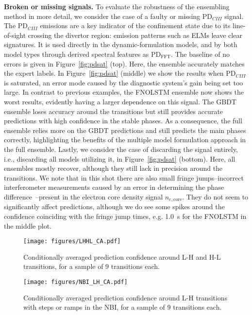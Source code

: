 \textbf{Broken or missing signals.} To evaluate the robustness of the ensembling method in more detail, we consider the case of a faulty or missing $\text{PD}_{\textit{CIII}}^{}$ signal. The $\text{PD}_{\textit{CIII}}^{}$ emissions are a key indicator of the confinement state due to its line-of-sight crossing the divertor region: emission patterns such as ELMs leave clear signatures. It is used directly in the dynamic-formulation models, and by both model types through derived spectral features as $\text{PD}_{\text{FFT}}^{}$. The baseline of no errors is given in Figure~\ref{fig:pdsat} (top). Here, the ensemble accurately matches the expert labels. In Figure~\ref{fig:pdsat} (middle) we show the results when $\text{PD}_{\textit{CIII}}^{}$ is saturated, an error mode caused by the diagnostic system's gain being set too large. In contrast to previous examples, the FNOLSTM ensemble now shows the worst results, evidently having a larger dependence on this signal. The GBDT ensemble loses accuracy around the transitions but still provides accurate predictions with high confidence in the stable phases. As a consequence, the full ensemble relies more on the GBDT predictions and still predicts the main phases correctly, highlighting the benefits of the multiple model formulation approach in the full ensemble. Lastly, we consider the case of discarding the signal entirely, i.e., discarding all models utilizing it, in Figure~\ref{fig:pdsat} (bottom). Here, all ensembles mostly recover, although they still lack in precision around the transitions. We note that in this shot there are also small fringe jumps--incorrect interferometer measurements caused by an error in determining the phase difference~\cite{murari2006}--present in the electron core density signal $n_{e,\text{core}}$. They do not seem to significantly affect predictions, although we do see some spikes around the confidence coinciding with the fringe jump times, e.g. \SI{1.0}{\second} for the FNOLSTM in the middle plot. %

\begin{figure}[t]
\begin{center}\texttt{[image: figures/LHHL\_CA.pdf]}\end{center}
    \caption{Conditionally averaged prediction confidence around L-H and H-L transitions, for a sample of 9 transitions each.}
    \label{fig:lh_hl}%
\end{figure}
\begin{figure}[t]
\begin{center}\texttt{[image: figures/NBI\_LH\_CA.pdf]}\end{center}
    \caption{Conditionally averaged prediction confidence around L-H transitions with steps or ramps in the NBI, for a sample of 9 transitions each.}
    \label{fig:nbi_ramp}%
\end{figure}

